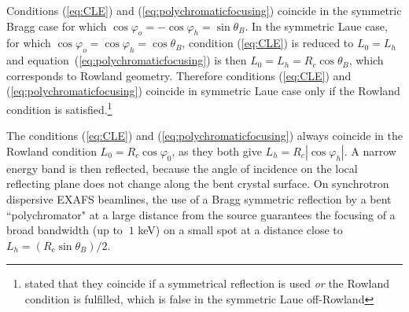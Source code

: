 \documentclass[preprint]{iucr}              %
\newcommand{\inblue}[1]{{\color{blue}#1}}
\newcommand{\inred}[1]{{\color{red}#1}}
\begin{document}






\inred{Conditions} (\ref{eq:CLE}) and (\ref{eq:polychromaticfocusing}) coincide in the symmetric Bragg case for which $\cos\varphi_o=-\cos\varphi_h=\sin\theta_B$. 
In the symmetric Laue case, for which $\cos\varphi_o=\cos\varphi_h=\cos\theta_B$,  condition (\ref{eq:CLE}) is reduced to $L_0=L_h$ and equation~(\ref{eq:polychromaticfocusing}) is then $L_0=L_h=R_c\cos\theta_B$, which corresponds to Rowland geometry. Therefore \inred{conditions} (\ref{eq:CLE}) and (\ref{eq:polychromaticfocusing}) coincide \inred{in} symmetric Laue case only if the Rowland condition is satisfied.\footnote{\cite{CK} stated that they coincide if a symmetrical reflection is used {\it or} the Rowland condition is fulfilled, which is false in the symmetric Laue off-Rowland}

The conditions (\ref{eq:CLE}) and (\ref{eq:polychromaticfocusing}) \inred{always} coincide \inred{in} the Rowland condition $L_0=R_c\cos\varphi_0$, as they both give $L_h=R_c|\cos\varphi_h|$. 
A narrow energy band \inred{is then reflected}, because the angle of incidence on the local reflecting plane does not change along the bent crystal surface.
\inred{
On synchrotron dispersive EXAFS beamlines, the use of a Bragg symmetric reflection by a bent ``polychromator" at a large distance from the source guarantees the focusing of a broad bandwidth (up to $~1$ keV) on a small spot \cite{Tolentino:ms0206} at a distance close to $L_h=(R_c\sin\theta_B)/2$. 
}

\end{document}
